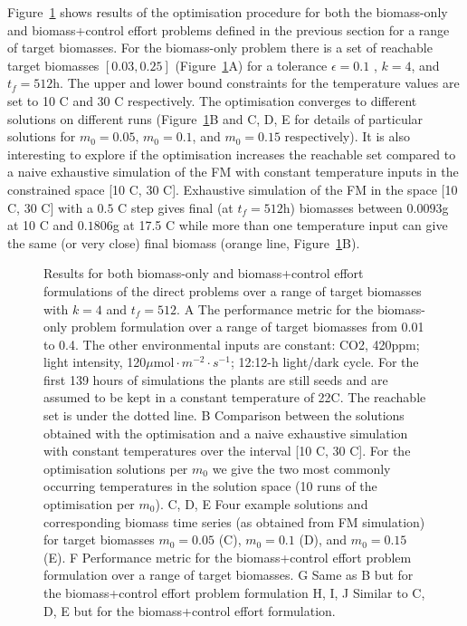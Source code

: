 Figure~\ref{fig:directPRes} shows results of the optimisation procedure for both
the biomass-only and biomass+control effort problems defined in the previous
section for a range of target biomasses. For the biomass-only problem there is a
set of reachable target biomasses $[0.03, 0.25]$ (Figure~\ref{fig:directPRes}A)
for a tolerance $\epsilon=0.1$ , $k=4$, and $t_f=512$h. The upper and lower
bound constraints for the temperature values are set to 10 \textdegree C and 30
\textdegree C respectively. The optimisation converges to different solutions on
different runs (Figure~\ref{fig:directPRes}B and C, D, E for details of
particular solutions for $m_0=0.05$, $m_0=0.1$, and $m_0=0.15$ respectively). It
is also interesting to explore if the optimisation increases the reachable set
compared to a naive exhaustive simulation of the FM with constant temperature
inputs in the constrained space [10 \textdegree C, 30 \textdegree C]. Exhaustive
simulation of the FM in the space [10 \textdegree C, 30 \textdegree C] with a
$0.5$ \textdegree C step gives final (at $t_f=512$h) biomasses between $0.0093$g
at 10 \textdegree C and $0.1806$g at 17.5 \textdegree C while more than one
temperature input can give the same (or very close) final biomass (orange line,
Figure~\ref{fig:directPRes}B).


\begin{figure}[p]
  \centering {}
  \caption{ Results for both biomass-only and biomass+control effort
    formulations of the direct problems over a range of target biomasses with
    $k=4$ and $t_f=512$. A The performance metric for the biomass-only problem
    formulation over a range of target biomasses from 0.01 to 0.4. The other
    environmental inputs are constant: CO2, 420ppm; light intensity,
    120$\mu\mathrm{mol} \cdot m^{-2} \cdot s^{-1}$; 12:12-h light/dark
    cycle. For the first 139 hours of simulations the plants are still seeds and
    are assumed to be kept in a constant temperature of 22\textdegree C. The
    reachable set is under the dotted line. B Comparison between the solutions
    obtained with the optimisation and a naive exhaustive simulation with
    constant temperatures over the interval [10 \textdegree C, 30 \textdegree
    C]. For the optimisation solutions per $m_0$ we give the two most commonly
    occurring temperatures in the solution space (10 runs of the optimisation
    per $m_0$). C, D, E Four example solutions and corresponding biomass time
    series (as obtained from FM simulation) for target biomasses $m_0=0.05$ (C),
    $m_0=0.1$ (D), and $m_0=0.15$ (E). F Performance metric for the
    biomass+control effort problem formulation over a range of target
    biomasses. G Same as B but for the biomass+control effort problem
    formulation H, I, J Similar to C, D, E but for the biomass+control effort
    formulation.}
\label{fig:directPRes}
\end{figure}

